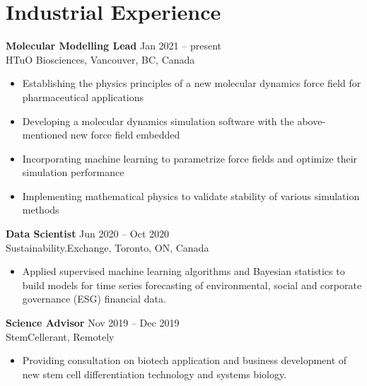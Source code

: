 \documentclass[11pt]{../yhlcv}
\begin{document}
\section*{Industrial Experience}

{\bf Molecular Modelling Lead}  \hfill Jan 2021 -- present\vspace{0.25em} \\
HTuO Biosciences, Vancouver, BC, Canada 
\vspace{-0.7em} \\
\begin{itemize}[leftmargin=*]\itemsep-0.2em
\item Establishing the physics principles of a new molecular dynamics force field for pharmaceutical applications
\item Developing a molecular dynamics simulation software with the above-mentioned new force field embedded
\item Incorporating machine learning to parametrize force fields and optimize their simulation performance
\item Implementing mathematical physics to validate stability of various simulation methods
\end{itemize}

{\bf Data Scientist} \hfill Jun 2020 -- Oct 2020\vspace{0.25em} \\
Sustainability.Exchange, Toronto, ON, Canada
\vspace{-0.7em}\\
\begin{itemize}[leftmargin=*]\itemsep-0.2em
\item Applied supervised machine learning algorithms and Bayesian statistics to build models for time series
forecasting of environmental, social and corporate governance (ESG) financial data.
\end{itemize}

{\bf Science Advisor} \hfill Nov 2019 -- Dec 2019\vspace{0.25em} \\
StemCellerant, {Remotely}
\vspace{-0.7em}\\
\begin{itemize}[leftmargin=*]\itemsep-0.2em
\item Providing consultation on biotech application and business development of new stem cell differentiation technology and systems biology.
\end{itemize}
\end{document}
